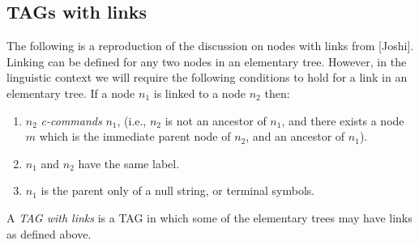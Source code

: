 \subsection{TAGs with links}

\begin{defn}
The following is a reproduction of the discussion on nodes with links from [Joshi]. Linking can be defined for any two nodes in an elementary tree. However, in the linguistic context we will require the following conditions to hold for a link in an elementary tree. If a node $n_1$ is linked to a node $n_2$ then:
\begin{enumerate}
\item{$n_2$ \emph{c-commands} $n_1$, (i.e., $n_2$ is not an ancestor of $n_1$, and there exists a node $m$ which is the immediate parent node of $n_2$, and an ancestor of $n_1$).}
\item{$n_1$ and $n_2$ have the same label.}
\item{$n_1$ is the parent only of a null string, or terminal symbols.}
\end{enumerate}
A \emph{TAG with links} is a TAG in which some of the elementary trees may have links as defined above.
\end{defn}

